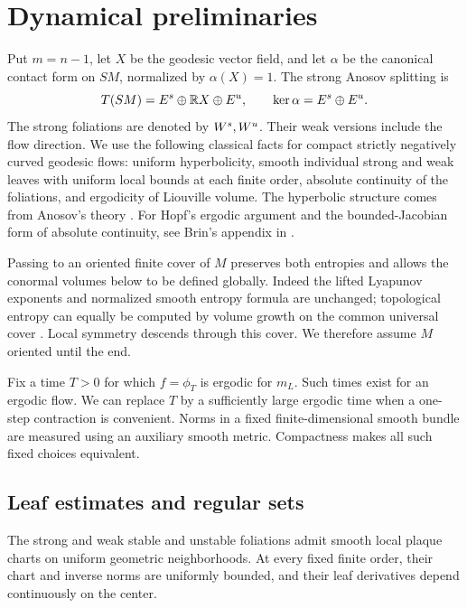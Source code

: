\section{Dynamical preliminaries}
\label{pre:section}

Put $m=n-1$, let $X$ be the geodesic vector field, and let $\alpha$
be the canonical contact form on $SM$, normalized by $\alpha(X)=1$.
The strong Anosov splitting is
\[
 T(SM)=E^s\oplus\mathbb R X\oplus E^u,
 \qquad \ker\alpha=E^s\oplus E^u.
\]
The strong foliations are denoted by $W^s,W^u$. Their weak versions
include the flow direction. We use the following classical facts for
compact strictly negatively curved geodesic flows: uniform
hyperbolicity, smooth individual strong and weak leaves with uniform
local bounds at each finite order, absolute continuity of the
foliations, and ergodicity of Liouville volume. The hyperbolic
structure comes from Anosov's theory \citep{Anosov1967}.
For Hopf's ergodic argument and the bounded-Jacobian form of
absolute continuity, see Brin's appendix in
\citet[Appendix, Sections~2 and~5]{Ballmann1995}.

Passing to an oriented finite cover of $M$ preserves both entropies
and allows the conormal volumes below to be defined globally.
Indeed the lifted Lyapunov exponents and normalized smooth entropy
formula are unchanged; topological entropy can equally be computed
by volume growth on the common universal cover \citep{Manning1979}. Local symmetry
descends through this cover. We therefore assume $M$ oriented until
the end.

Fix a time $T>0$ for which $f=\phi_T$ is ergodic for $m_L$.
Such times exist for an ergodic flow. We can replace $T$ by a
sufficiently large ergodic time when a one-step contraction is
convenient. Norms in a fixed finite-dimensional smooth bundle are
measured using an auxiliary smooth metric. Compactness makes all
such fixed choices equivalent.

\subsection{Leaf estimates and regular sets}

\begin{lemma}\label{pre:uniform-plaques}
The strong and weak stable and unstable foliations admit smooth
local plaque charts on uniform geometric neighborhoods. At every
fixed finite order, their chart and inverse norms are uniformly
bounded, and their leaf derivatives depend continuously on the center.
\end{lemma}

